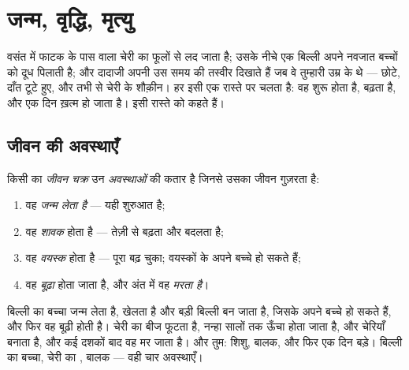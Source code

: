 \chapter{जन्म, वृद्धि, मृत्यु}\label{ch:g2:born-grow-die}

वसंत में फाटक के पास वाला चेरी का  फूलों से लद जाता है; उसके नीचे
एक बिल्ली अपने नवजात बच्चों को दूध पिलाती है; और दादाजी अपनी उस समय
की तस्वीर दिखाते हैं जब वे तुम्हारी उम्र के थे --- छोटे, दाँत टूटे
हुए, और तभी से चेरी के शौक़ीन। हर  इसी एक रास्ते पर चलता है: वह
शुरू होता है, बढ़ता है, और एक दिन ख़त्म हो जाता है। इसी रास्ते को
 कहते हैं।

\section{जीवन की अवस्थाएँ}

\begin{definition}[जीवन चक्र]\label{def:g2:born-grow-die:cycle}
किसी  का \emph{जीवन चक्र} उन
\emph{अवस्थाओं} की कतार है जिनसे उसका जीवन गुज़रता है:
\begin{enumerate}
  \item वह \emph{जन्म लेता है} --- यही शुरुआत है;
  \item वह \emph{शावक} होता है --- तेज़ी से बढ़ता और
        बदलता है;
  \item वह \emph{वयस्क} होता है --- पूरा बढ़ चुका;
        वयस्कों के अपने बच्चे हो सकते हैं;
  \item वह \emph{बूढ़ा} होता जाता है, और अंत में वह
        \emph{मरता है}।
\end{enumerate}
\end{definition}

\begin{example}[तीन जीवन, एक ही रास्ता]\label{ex:g2:born-grow-die:three}
बिल्ली का बच्चा जन्म लेता है, खेलता है और बड़ी बिल्ली बन जाता है,
जिसके अपने बच्चे हो सकते हैं, और फिर वह बूढ़ी होती है। चेरी का बीज
फूटता है, नन्हा  सालों तक ऊँचा होता जाता है,    और
चेरियाँ बनाता है, और कई दशकों बाद वह मर जाता है। और तुम: शिशु, बालक,
और फिर एक दिन बड़े। बिल्ली का बच्चा, चेरी का , बालक --- वही चार
अवस्थाएँ।
\end{example}

